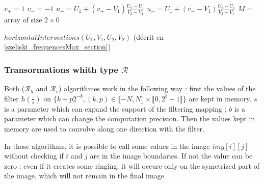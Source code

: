   \begin{algorithme}
   $v_+ = 1$\;
   $v_- = -1$\;
   $u_+ = U_1+(v_+-V_1)\frac{U_2-U_1}{V_2-V_1}$\;
   $u_- = U_1+(v_--V_1)\frac{U_2-U_1}{V_2-V_1}$\;
   $M =$ array of size $2 \times 0$\;
   \caption{$horizontalIntersections(U_1,V_1,U_2,V_2)$ (décrit en \ref{szeliski_frequencesMax_section})}
   \label{szeliski_intersectionsHorizontales}
  \end{algorithme}
  
  \subsubsection{Transormations whith type $\mathcal R$}
  
	Both ($\mathcal{R}_h$ and $\mathcal{R}_v$) algorithmes work in the following way : first the values of the filter $h(\frac{\dot{}}{s})$ on $\{k+p2^{-b},(k,p)\in \llbracket -N,N \rrbracket \times \llbracket 0,2^b-1 \rrbracket\}$ are kept in memory. $s$ is a parameter which can expand the support of the filtering mapping ; $b$ is a parameter which can change the computation precision. Then the values kept in memory are used to convolve along one direction with the filter.


  

In those algorithms, it is possible to call some values in the image $img[i][j]$ without checking if $i$ and $j$ are in the image boundaries. If not the value can be zero : even if it creates some ringing, it will occure only on the symetrized part of the image, which will not remain in the final image.

  
